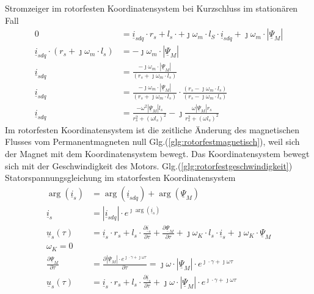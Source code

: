 	Stromzeiger im rotorfesten Koordinatensystem bei Kurzschluss im stationären Fall
	\begin{align}
		0 &= \underline{i}_{sdq} \cdot r_s + l_s \cdot + \jmath \omega_m \cdot l_S \cdot \underline{i}_{sdq} + \jmath \omega_m \cdot |\underline{\Psi}_M|\\
		\underline{i}_{sdq} \cdot (r_s + \jmath \omega_m \cdot l_s) & =  - \jmath \omega_m \cdot |\underline{\Psi}_M|\\
		\underline{i}_{sdq}  & =  \frac{- \jmath \omega_m \cdot |\underline{\Psi}_M|}{(r_s + \jmath \omega_m \cdot l_s)}\\
		\underline{i}_{sdq}  & =  \frac{- \jmath \omega_m \cdot |\underline{\Psi}_{M}|}{(r_s + \jmath \omega_m \cdot l_s)} \cdot \frac{(r_s - \jmath \omega_m \cdot l_s)}{(r_s - \jmath \omega_m \cdot l_s)}\\
		\underline{i}_{sdq}  & = \frac{-\omega^2 |\underline{\Psi}_M| l_s}{r_s^2 + (\omega l_s)^2} -\jmath \frac{\omega |\underline{\Psi}_M| r_s}{r_s^2 + (\omega l_s)^2}\label{glg:stromzeiger rotorfest ks}
	\end{align}
	Im rotorfesten Koordinatensystem ist die zeitliche Änderung des magnetischen Flusses vom Permanentmagneten null Glg.(\ref{glg:rotorfestmagnetisch}), weil  sich der Magnet mit dem Koordinatensystem bewegt. Das Koordinatensystem bewegt sich mit der Geschwindigkeit des Motors. Glg.(\ref{glg:rotorfestgeschwindigkeit})\\ 
	Statorspannungsgleichung im statorfesten Koordinatensystem
	\begin{align}
		\arg(\underline{i}_s) &= \arg(\underline{i}_{sdq}) + \arg(\underline{\Psi}_M)\\
		\underline{i}_s &= |\underline{i}_{sdq}| \cdot e^{\jmath \arg(\underline{i}_{s})}\\
		\underline{u}_s(\tau) &= \underline{i}_s \cdot r_s + l_s \cdot \frac{\partial \underline{i}_s}{\partial \tau} + \frac{\partial \underline{\Psi}_M}{\partial \tau} + \jmath \omega_K \cdot l_s \cdot \underline{i}_s + \jmath \omega_K \cdot \underline{\Psi}_M \\
		\omega_K=0 \label{glg:statorfest} \\
		\frac{\partial \underline{\Psi}_M}{\partial \tau} &= \frac{\partial |\underline{\Psi}_M | \cdot e^{\jmath \cdot \gamma + \jmath \omega \tau}}{\partial \tau} = \jmath\omega \cdot|\underline{\Psi}_M | \cdot e^{\jmath \cdot \gamma + \jmath \omega \tau}\\
		\underline{u}_s(\tau) &= \underline{i}_s \cdot r_s + l_s \cdot \frac{\partial \underline{i}_s}{\partial \tau} + \jmath\omega \cdot|\underline{\Psi}_M | \cdot e^{\jmath \cdot \gamma + \jmath \omega \tau} \label{glg:spannungraumzeiger rotor}
	\end{align}
